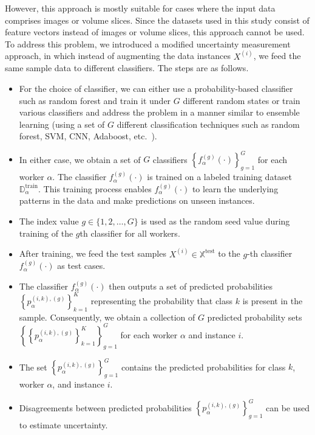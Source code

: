 \documentclass[sn-nature]{bst/sn-jnl}
\begin{document}
However, this approach is mostly suitable for cases where the input data comprises images or volume slices. Since the datasets used in this study consist of feature vectors instead of images or volume slices, this approach cannot be used. To address this problem, we introduced a modified uncertainty measurement approach, in which instead of augmenting the data instances $X^{(i)} $, we feed the same sample data to different classifiers.
The steps are as follows.
\begin{itemize}
    \item For the choice of classifier, we can either use a probability-based classifier such as random forest and train it under $G $ different random states or train various classifiers and address the problem in a manner similar to ensemble learning (using a set of $G $ different classification techniques such as random forest, SVM, CNN, Adaboost, etc.~\cite{zhou_Ensemblelearning_2009}).
    \item In either case, we obtain a set of $G $ classifiers ${\left\{f_{\alpha}^{(g)}( \cdot)\right\}}_{g=1}^G $ for each worker $\alpha $. The classifier $f_{\alpha}^{(g)}( \cdot) $ is trained on a labeled training dataset $\mathbb{D}_\alpha^{\mathrm{train}}$. This training process enables $f_{\alpha}^{(g)}(\cdot) $ to learn the underlying patterns in the data and make predictions on unseen instances.
    \item The index value $g  \in \{1,2,\dots,G\} $ is used as the random seed value during training of the $g$\-th classifier for all workers.
    \item After training, we feed the test samples $X^{(i)}\in \mathbb{X}^{\text{test}} $ to the $g $-th classifier $f_{\alpha}^{(g)}(\cdot) $ as test cases.
    \item The classifier $f_{\alpha}^{(g)}(\cdot) $ then outputs a set of predicted probabilities ${\left\{p_{\alpha}^{(i,k),(g)}\right\}}_{k=1}^{K} $ representing the probability that class $k $ is present in the sample. Consequently, we obtain a collection of $G $ predicted probability sets ${\left\{ {\left\{ p_{\alpha}^{(i,k),(g)}\right\}}_{k=1}^K \right\}}_{g=1}^G $ for each worker $\alpha $ and instance $i $.
    \item The set ${\left\{p_{\alpha}^{(i,k),(g)}\right\}}_{g=1}^G $ contains the predicted probabilities for class $k $,
    worker $\alpha $, and instance $i $.
    \item Disagreements between predicted probabilities ${\left\{p_{\alpha}^{(i,k),(g)}\right\}}_{g=1}^G $ can be used to estimate uncertainty.

\end{itemize}
\end{document}
